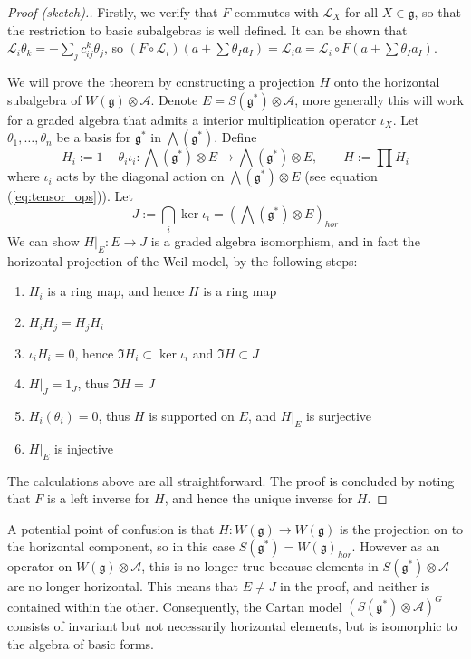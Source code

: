 \begin{proof}[Proof (sketch).]
	Firstly, we verify that $F$ commutes with $\mathcal{L}_X$ for all
	$X\in\mathfrak{g}$, so that the restriction to basic subalgebras is well defined. 
	It can be shown that $\mathcal{L}_i \theta_k = -\sum_j c_{ij}^k\theta_j$, so
	$(F\circ \mathcal{L}_i)(a+\sum \theta_Ia_I) = \mathcal{L}_i a =
	\mathcal{L}_i \circ F(a+\sum \theta_Ia_I)$.

	We will prove the theorem by constructing a projection $H$ onto the horizontal
	subalgebra of $W(\mathfrak{g})\otimes \mathcal{A}$.
	Denote  $E=S(\mathfrak{g}^*)\otimes \mathcal{A}$, more generally this will
	work for a graded algebra that admits a interior multiplication operator
	$\iota_X$. Let $\theta_1,\ldots,\theta_n$ be a basis for $\mathfrak{g}^*$ in
	$\bigwedge (\mathfrak{g}^*)$. Define 
	 \[
		 H_i := 1 - \theta_i \iota_i : \bigwedge(\mathfrak{g}^*)\otimes E \to 
		\bigwedge(\mathfrak{g}^*)\otimes E, \qquad
		H := \prod H_i
	\] 
	where $\iota_i$ acts by the diagonal
	action on  $\bigwedge(\mathfrak{g}^*)\otimes E$ (see equation
	(\ref{eq:tensor_ops})). Let 
	\[
	J := \bigcap_i \ker \iota_i = (\bigwedge(\mathfrak{g}^*)\otimes E)_{hor}
	\] 
	We can show $H|_E : E \to J$ is a graded algebra isomorphism, and in fact
	the horizontal projection of the Weil model, by the following steps: 
	\begin{enumerate}[(1)]
	    \item $H_i$ is a ring map, and hence  $H$ is a ring map
		\item $H_iH_j = H_jH_i$ 
		\item $\iota_i H_i = 0$, hence  $\Im H_i \subset \ker \iota_i$ 
			and $\Im H \subset J$
		\item $H|_J = 1_J$, thus $\Im H = J$ 
		\item $H_i(\theta_i) = 0$, thus $H$ is supported on $E$, and $H|_E$ is surjective
		\item $H|_E$ is injective
	\end{enumerate}
	The calculations above are all straightforward. The proof is concluded by
	noting that $F$ is a left inverse for  $H$, and hence the unique
	inverse for $H$.
\end{proof}

\begin{remark} \label{remark:cartan_not_horizontal}
	A potential point of confusion is that $H:W(\mathfrak{g})\to W(\mathfrak{g})$ 
	is the projection on to the horizontal component, so in this case 
	$S(\mathfrak{g}^*) = W(\mathfrak{g})_{hor}$. However as an operator on
	$W(\mathfrak{g})\otimes \mathcal{A}$, this is no longer true because
	elements in $S(\mathfrak{g}^*)\otimes \mathcal{A}$ are no longer horizontal.
	This means that $E \neq J$ in the proof, and neither is contained within the other. 
	Consequently, the Cartan model  $(S(\mathfrak{g}^*)\otimes \mathcal{A})^G$
	consists of invariant but not necessarily horizontal elements, but is
	isomorphic to the algebra of basic forms.
\end{remark}


